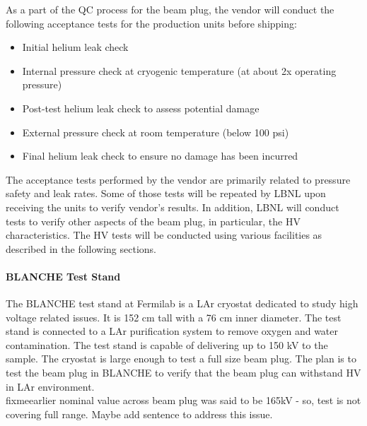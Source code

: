 As a part of the QC process for the beam plug, the vendor will conduct the following acceptance tests for the production units before shipping:
\begin{itemize}
\item {Initial helium leak check}
\item {Internal pressure check at cryogenic temperature (at about 2x operating pressure)}
\item {Post-test helium leak check to assess potential damage}
\item {External pressure check at room temperature (below 100 psi)}
\item {Final helium leak check to ensure no damage has been incurred}
\end{itemize}
The acceptance tests performed by the vendor are primarily related to pressure safety and leak rates. Some of those tests will be repeated by LBNL upon receiving the units to verify vendor's results. In addition, LBNL will conduct tests to verify other aspects of the beam plug, in particular, the HV characteristics. The HV tests will be conducted using various facilities as described in the following sections.

\paragraph{BLANCHE Test Stand}
The BLANCHE test stand at Fermilab is a LAr cryostat dedicated to study high voltage related issues. It is 152 cm tall with a 76 cm inner diameter. The test stand is connected to a LAr purification system to remove oxygen and water contamination. The test stand is capable of delivering up to 150 kV to the sample. The cryostat is large enough to test a full size beam plug. The plan is to test the beam plug in BLANCHE to verify that the beam plug can withstand HV in LAr environment.
\\fixme{earlier nominal value across beam plug was said to be 165kV - so, test is not covering full range. Maybe add sentence to address this issue.}

